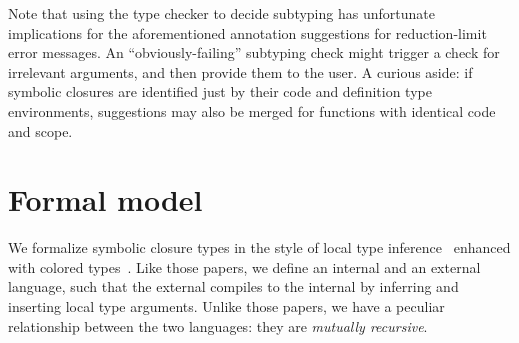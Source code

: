 Note that using the type checker to decide subtyping
has unfortunate implications for 
the aforementioned annotation suggestions
for reduction-limit error messages.
An ``obviously-failing'' subtyping check might trigger a
check for irrelevant arguments, and then provide them to the user.
A curious aside: if symbolic closures are identified just by their code and definition
type environments, suggestions may also be merged for functions with
identical code and scope.

%




\section{Formal model}

We formalize symbolic closure types in the style of local type inference~\cite{PierceLTI}
enhanced with colored types~\cite{coloredlti01}.
Like those papers, we define an internal and an external language,
such that the external compiles to the internal by inferring 
and inserting local type arguments.
Unlike those papers,
we have a peculiar relationship between the two languages:
they are \emph{mutually recursive}.

